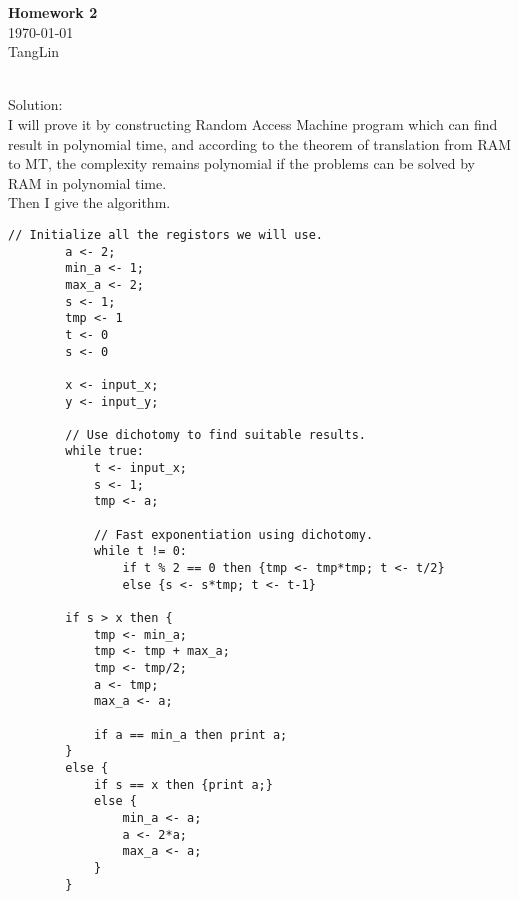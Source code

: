 \documentclass[a4papper]{article}
\theoremstyle{neosn}
\begin{document}
    \begin{center}
    {\bf Homework 2} \\
        \today \\
        TangLin
    \end{center}

     \\

    Solution:\\

    I will prove it by constructing Random Access Machine program which can find result in polynomial time,
    and according to the theorem of translation from RAM to MT, the complexity remains polynomial if
    the problems can be solved by RAM in polynomial time. \\

    Then I give the algorithm. \\

    \begin{lstlisting}[label={lst:lstlisting22}]
        // Initialize all the registors we will use.
        a <- 2;
        min_a <- 1;
        max_a <- 2;
        s <- 1;
        tmp <- 1
        t <- 0
        s <- 0

        x <- input_x;
        y <- input_y;

        // Use dichotomy to find suitable results.
        while true:
            t <- input_x;
            s <- 1;
            tmp <- a;

            // Fast exponentiation using dichotomy.
            while t != 0:
                if t % 2 == 0 then {tmp <- tmp*tmp; t <- t/2}
                else {s <- s*tmp; t <- t-1}

        if s > x then {
            tmp <- min_a;
            tmp <- tmp + max_a;
            tmp <- tmp/2;
            a <- tmp;
            max_a <- a;

            if a == min_a then print a;
        }
        else {
            if s == x then {print a;}
            else {
                min_a <- a;
                a <- 2*a;
                max_a <- a;
            }
        }
    \end{lstlisting}
\end{document}
